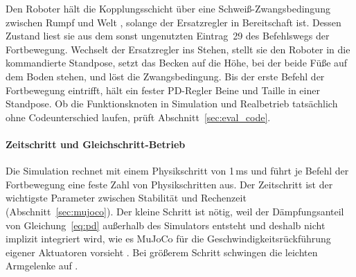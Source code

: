 Den Roboter hält die Kopplungsschicht über eine Schweiß-Zwangsbedingung zwischen Rumpf und Welt \cite{MujocoDoku2026}, solange der Ersatzregler in Bereitschaft ist.
Dessen Zustand liest sie aus dem sonst ungenutzten Eintrag~29 des Befehlswegs der Fortbewegung.
Wechselt der Ersatzregler ins Stehen, stellt sie den Roboter in die kommandierte Standpose, setzt das Becken auf die Höhe, bei der beide Füße auf dem Boden stehen, und löst die Zwangsbedingung.
Bis der erste Befehl der Fortbewegung eintrifft, hält ein fester PD-Regler Beine und Taille in einer Standpose.
Ob die Funktionsknoten in Simulation und Realbetrieb tatsächlich ohne Codeunterschied laufen, prüft Abschnitt~\ref{sec:eval_code}.

\paragraph*{Zeitschritt und Gleichschritt-Betrieb}
\label{sec:zeitschritt}%
Die Simulation rechnet mit einem Physikschritt von 1\,ms und führt je Befehl der Fortbewegung eine feste Zahl von Physikschritten aus.
Der Zeitschritt ist der wichtigste Parameter zwischen Stabilität und Rechenzeit (Abschnitt~\ref{sec:mujoco}).
Der kleine Schritt ist nötig, weil der Dämpfungsanteil von Gleichung~\ref{eq:pd} außerhalb des Simulators entsteht und deshalb nicht implizit integriert wird, wie es MuJoCo für die Geschwindigkeitsrückführung eigener Aktuatoren vorsieht \cite{MujocoDoku2026b}.
Bei größerem Schritt schwingen die leichten Armgelenke auf .

